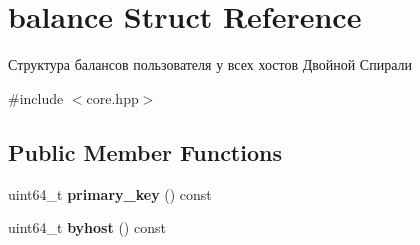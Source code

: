\hypertarget{structbalance}{}\section{balance Struct Reference}
\label{structbalance}


Структура балансов пользователя у всех хостов Двойной Спирали  




{\ttfamily \#include $<$core.\+hpp$>$}

\subsection*{Public Member Functions}
\begin{DoxyCompactItemize}
\item 
\mbox{\label{structbalance_a748ad87c69d0195c26a690857b427cc9}} 
uint64\+\_\+t {\bfseries primary\+\_\+key} () const
\item 
\mbox{\label{structbalance_a728c8bb1d05ff085aca6d4f3d4ee3e02}} 
uint64\+\_\+t {\bfseries byhost} () const
\end{DoxyCompactItemize}
